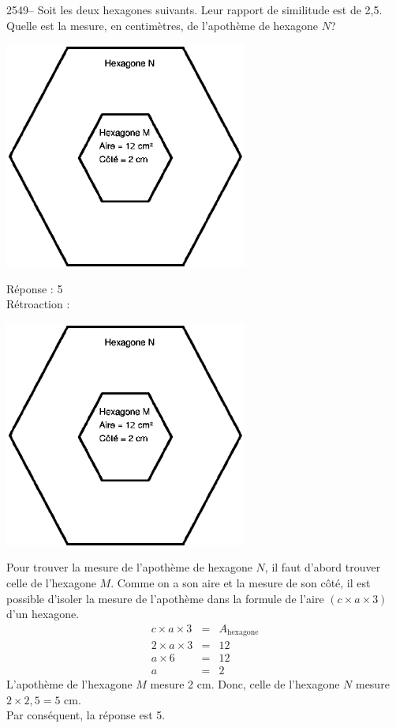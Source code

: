 \documentclass[letterpaper, 12pt]{article}
\begin{document}
2549--  Soit les deux hexagones suivants. Leur rapport de similitude est de 2,5. Quelle est la mesure, en centim\`etres, de l'apoth\`eme de hexagone $N$?\\
\begin{center}
 \includegraphics[width=8cm,bb=14 14 372 285]{Q2549.eps}
\end{center}


R\'eponse : 5\\

R\'etroaction :\\
\begin{center}
 \includegraphics[width=8cm,bb=14 14 372 285]{Q2549.eps}
\end{center}
Pour trouver la mesure de l'apoth\`eme de hexagone $N$, il faut d'abord trouver celle de l'hexagone $M$. Comme on a son aire et la mesure de son c\^ot\'e, il est possible d'isoler la mesure de l'apoth\`eme dans la formule de l'aire $(c\times a \times 3)$ d'un hexagone.
\begin{eqnarray*}
c\times a \times 3&=&A_{\textrm{hexagone}}\\
2\times a \times 3 &=& 12\\
 a\times 6 &=& 12\\
a&=&2
\end{eqnarray*}
L'apoth\`eme de l'hexagone $M$ mesure 2 cm. Donc, celle de l'hexagone $N$ mesure $2\times 2,5 = 5$ cm.\\
Par cons\'equent, la r\'eponse est 5.\\
\end{document}
